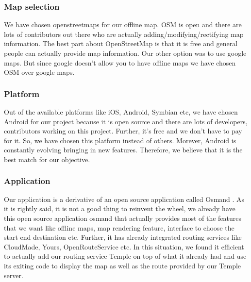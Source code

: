 \documentclass[a4paper,12pt, notitlepage, oneside, onecolumn]{article}
\begin{document}
\subsubsection{Map selection}
We have chosen openstreetmaps\cite{openstreetmap} for our offline map. OSM is open and there are lots of contributors out there who are actually adding/modifying/rectifying map information. The best part about OpenStreetMap is that it is free and general people can actually provide map information. Our other option was to use google maps. But since google doesn't allow you to have offline maps we have chosen OSM over google maps.

\subsubsection{Platform}
Out of the available platforms like iOS, Android, Symbian etc, we have chosen Android\cite{android} for our project because it is open source and there are lots of developers, contributors working on this project. Further, it's free and we don't have to pay for it. So, we have chosen this platform instead of others. Morever, Android is constantly evolving bringing in new features. Therefore, we believe that it is the best match for our objective. 

\subsubsection{Application}
Our application is a derivative of an open source application called Osmand \cite{osmand}.  As it is rightly said, it is not a good thing to reinvent the wheel, we already have this open source application osmand that actually provides most of the features that we want like offline maps, map rendering feature, interface to choose the start end destination etc. Further, it has already integrated routing services like CloudMade, Yours, OpenRouteService etc. In this situation, we found it efficient to actually add our routing service Temple on top of what it already had and use its exiting code to display the map as well as the route provided by our Temple server.\\
\end{document}
